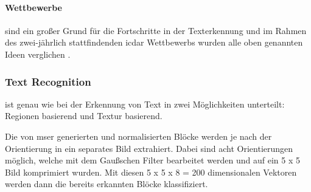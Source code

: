 \paragraph{Wettbewerbe}\label{ICDAR} sind ein großer Grund für die Fortschritte in der Texterkennung und im Rahmen des zwei-jährlich stattfindenden \Gls{icdar} Wettbewerbs wurden alle oben genannten Ideen verglichen \cite{ICDAR:online}.

\subsubsection{Text Recognition} ist genau wie bei der Erkennung von Text in zwei Möglichkeiten unterteilt: Regionen basierend und Textur basierend.

Die von \gls{mser} generierten und normalisierten Blöcke werden je nach der Orientierung in ein separates Bild extrahiert. Dabei sind acht Orientierungen möglich, welche mit dem Gaußschen Filter bearbeitet werden und auf ein 5 x 5 Bild komprimiert wurden. Mit diesen 5 x 5 x 8 = 200 dimensionalen Vektoren werden dann die bereits erkannten Blöcke klassifiziert. \cite{SWT:online}
